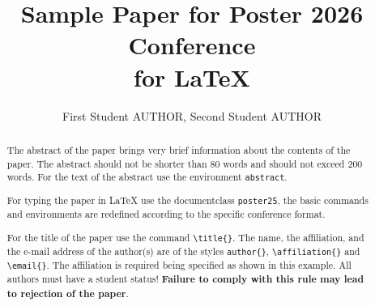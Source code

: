 \documentclass{poster26}
\begin{document}

%
\title{Sample Paper for Poster 2026 Conference \\ for \LaTeX}
%

%
\author{First Student AUTHOR, Second Student AUTHOR}
%


\maketitle


\begin{abstract}
The abstract of the paper brings very brief information about the contents of the paper. The abstract should not be shorter than 80 words and should not exceed 200 words. For the text of the abstract use the environment \verb+abstract+.

For typing the paper in \LaTeX{} use the documentclass \verb+poster25+, the basic commands and environments are redefined according to the specific conference format.

For the title of the paper use the command \verb+\title{}+. The name, the affiliation, and the e-mail address of the author(s) are of the styles \verb+author{}+, \verb+\affiliation{}+ and \verb+\email{}+. The affiliation is required being specified as shown in this example. All authors must have a student status! \textbf{Failure to comply with this rule may lead to rejection of the paper}.
\end{abstract}
\end{document}
